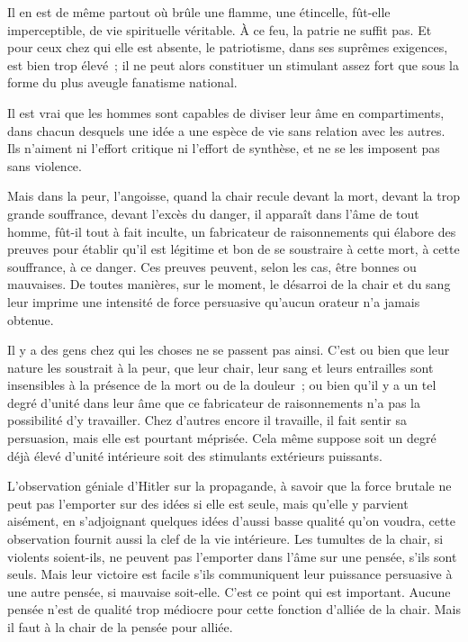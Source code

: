 \documentclass[french,twoside]{book} %
\begin{document}
Il en est de même partout où brûle une flamme, une étincelle, fût-elle imperceptible, de vie spirituelle véritable. À ce feu, la patrie ne suffit pas. Et pour ceux chez qui elle est absente, le patriotisme, dans ses suprêmes exigences, est bien trop élevé ; il ne peut alors constituer un stimulant assez fort que sous la forme du plus aveugle fanatisme national.\par
Il est vrai que les hommes sont capables de diviser leur âme en compartiments, dans chacun desquels une idée a une espèce de vie sans relation avec les autres. Ils n'aiment ni l'effort critique ni l'effort de synthèse, et ne se les imposent pas sans violence.\par
Mais dans la peur, l'angoisse, quand la chair recule devant la mort, devant la trop grande souffrance, devant l'excès du danger, il apparaît dans l'âme de tout homme, fût-il tout à fait inculte, un fabricateur de raisonnements qui élabore des preuves pour établir qu'il est légitime et bon de se soustraire à cette mort, à cette souffrance, à ce danger. Ces preuves peuvent, selon les cas, être bonnes ou mauvaises. De toutes manières, sur le moment, le désarroi de la chair et du sang leur imprime une intensité de force persuasive qu'aucun orateur n'a jamais obtenue.\par
Il y a des gens chez qui les choses ne se passent pas ainsi. C'est ou bien que leur nature les soustrait à la peur, que leur chair, leur sang et leurs entrailles sont insensibles à la présence de la mort ou de la douleur ; ou bien qu'il y a un tel degré d'unité dans leur âme que ce fabricateur de raisonnements n'a pas la possibilité d'y travailler. Chez d'autres encore il travaille, il fait sentir sa persuasion, mais elle est pourtant méprisée. Cela même suppose soit un degré déjà élevé d'unité intérieure soit des stimulants extérieurs puissants.\par
L'observation géniale d'Hitler sur la propagande, à savoir que la force brutale ne peut pas l’emporter sur des idées si elle est seule, mais qu’elle y parvient aisément, en s'adjoignant quelques idées d'aussi basse qualité qu'on voudra, cette observation fournit aussi la clef de la vie intérieure. Les tumultes de la chair, si violents soient-ils, ne peuvent pas l'emporter dans l'âme sur une pensée, s’ils sont seuls. Mais leur victoire est facile s'ils communiquent leur puissance persuasive à une autre pensée, si mauvaise soit-elle. C'est ce point qui est important. Aucune pensée n'est de qualité trop médiocre pour cette fonction d'alliée de la chair. Mais il faut à la chair de la pensée pour alliée.\par
\end{document}
